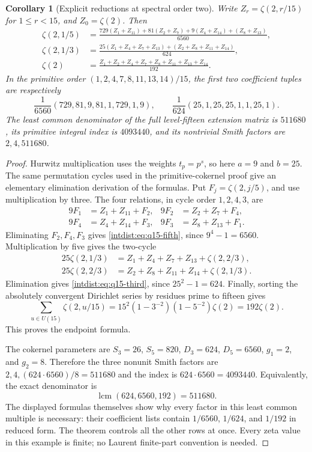 \documentclass[11pt,a4paper]{article}
\numberwithin{equation}{section}
\theoremstyle{plain}
\newtheorem{corollary}[theorem]{Corollary}
\theoremstyle{definition}
\theoremstyle{remark}
\begin{document}
\begin{corollary}[Explicit reductions at spectral order two]
\label{intdist:cor:q15s2}
Write $Z_r=\zeta(2,r/15)$ for $1\le r<15$, and $Z_0=\zeta(2)$.
Then
\begin{align}
\zeta(2,1/5)
&=\frac{729(Z_1+Z_{11})+81(Z_2+Z_7)
                +9(Z_4+Z_{14})+(Z_8+Z_{13})}{6560},
\label{intdist:eq:q15-fifth}\\
\zeta(2,1/3)
&=\frac{25(Z_1+Z_4+Z_7+Z_{13})
                  +(Z_2+Z_8+Z_{11}+Z_{14})}{624},
\label{intdist:eq:q15-third}\\
\zeta(2)
&=\frac{Z_1+Z_2+Z_4+Z_7+Z_8+Z_{11}+Z_{13}+Z_{14}}{192}.
\label{intdist:eq:q15-endpoint}
\end{align}
In the primitive order $(1,2,4,7,8,11,13,14)/15$, the first two
coefficient tuples are respectively
\[
 \frac1{6560}(729,81,9,81,1,729,1,9),\qquad
 \frac1{624}(25,1,25,25,1,1,25,1).
\]
The least common denominator of the full level-fifteen extension
matrix is $511680$, its primitive integral index is $4093440$, and
its nontrivial Smith factors are $2,4,511680$.
\end{corollary}

\begin{proof}
Hurwitz multiplication uses the weights $t_p=p^s$, so here $a=9$ and
$b=25$. The same permutation cycles used in the primitive-cokernel
proof give an elementary elimination derivation of the formulas.
Put $F_j=\zeta(2,j/5)$, and use multiplication by three. The four
relations, in cycle order $1,2,4,3$, are
\[
\begin{aligned}
9F_1&=Z_1+Z_{11}+F_2,&
9F_2&=Z_2+Z_7+F_4,\\
9F_4&=Z_4+Z_{14}+F_3,&
9F_3&=Z_8+Z_{13}+F_1.
\end{aligned}
\]
Eliminating $F_2,F_4,F_3$ gives
\eqref{intdist:eq:q15-fifth}, since $9^4-1=6560$.
Multiplication by five gives the two-cycle
\[
\begin{aligned}
25\zeta(2,1/3)&=Z_1+Z_4+Z_7+Z_{13}+\zeta(2,2/3),\\
25\zeta(2,2/3)&=Z_2+Z_8+Z_{11}+Z_{14}+\zeta(2,1/3).
\end{aligned}
\]
Elimination gives \eqref{intdist:eq:q15-third}, since $25^2-1=624$.
Finally, sorting the absolutely convergent Dirichlet series by
residues prime to fifteen gives
\[
 \sum_{u\in U(15)}\zeta(2,u/15)
 =15^2(1-3^{-2})(1-5^{-2})\zeta(2)=192\zeta(2).
\]
This proves the endpoint formula.

The cokernel parameters are $S_3=26$, $S_5=820$, $D_3=624$,
$D_5=6560$, $g_1=2$, and $g_2=8$. Therefore the three nonunit Smith
factors are $2,4,(624\cdot6560)/8=511680$ and the index is
$624\cdot6560=4093440$. Equivalently, the exact denominator is
\[
 \operatorname{lcm}(624,6560,192)=511680.
\]
The displayed formulas themselves show why every factor in this least
common multiple is necessary: their coefficient lists contain
$1/6560$, $1/624$, and $1/192$ in reduced form. The theorem controls
all the other rows at once. Every zeta value in this example is
finite; no Laurent finite-part convention is needed.
\end{proof}
\end{document}
